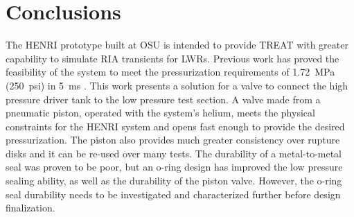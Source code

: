 \section{Conclusions} \label{s:conclusion}
The HENRI prototype built at OSU is intended to provide TREAT with greater capability to simulate RIA transients for LWRs. Previous work has proved the feasibility of the system to meet the pressurization requirements of \SI{1.72}{\mega\pascal} (\SI{250}{psi}) in \SI{5}{\milli\second} \cite{HeNURETH}. This work presents a solution for a valve to connect the high pressure driver tank to the low pressure test section. A valve made from a pneumatic piston, operated with the system's helium, meets the physical constraints for the HENRI system and opens fast enough to provide the desired pressurization. The piston also provides much greater consistency over rupture disks and it can be re-used over many tests. The durability of a metal-to-metal seal was proven to be poor, but an o-ring design has improved the low pressure sealing ability, as well as the durability of the piston valve. However, the o-ring seal durability needs to be investigated and characterized further before design finalization.